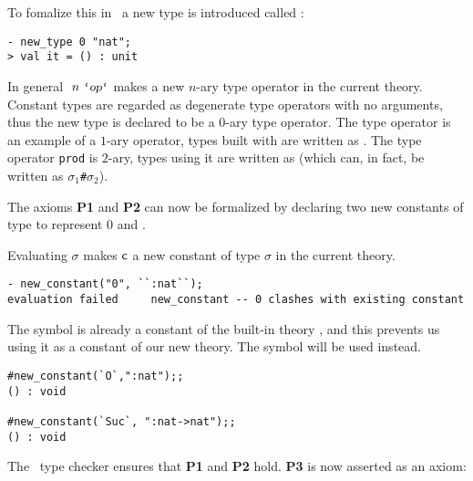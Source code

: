 To fomalize this in \HOL\ a new type is introduced called :

\begin{session}\begin{verbatim}
- new_type 0 "nat";
> val it = () : unit
\end{verbatim}\end{session}

    In general $\ n\ \ml{`\ty{op}`}$ makes  a new
    $n$-ary type operator in the current theory.  Constant types are
    regarded as degenerate type operators with no arguments, thus the
    new type  is declared to be a $0$-ary type operator. The
    type operator  is an example of a $1$-ary operator, types
    built with  are written as . The type
    operator {\small\verb|prod|} is $2$-ary, types using it are
    written as  (which can, in fact,
    be written as $\sigma_1${\small\verb|#|}$\sigma_2$).

    The axioms {\small\bf P1} and {\small\bf P2} can now be formalized
    by declaring two new constants of type  to represent $0$
    and \Suc.

    Evaluating $\sigma$\ml{)} makes
    ${\sf c}$ a new constant of type $\sigma$ in the current theory.

\begin{session}\begin{verbatim}
- new_constant("0", ``:nat``);
evaluation failed     new_constant -- 0 clashes with existing constant
\end{verbatim}\end{session}


The symbol 
is already a constant of the built-in theory , and this prevents
us using it as a constant of our new theory. The symbol  will be used
instead.

\begin{session}\begin{verbatim}
#new_constant(`O`,":nat");;
() : void

#new_constant(`Suc`, ":nat->nat");;
() : void
\end{verbatim}\end{session}



The \HOL\ type checker ensures that {\small\bf P1} and {\small\bf P2} hold.
{\small\bf P3} is now asserted as an axiom:

